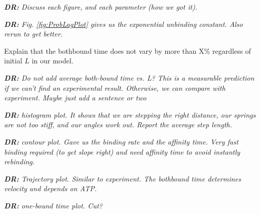 \documentclass[9pt,twocolumn,twoside]{article}
\newcommand\davidsays[1]{{\em\color{blue} {\bf DR:} #1}}
\begin{document}
\newpage

\davidsays{Discuss each figure, and each parameter (how we got it).}

\davidsays{Fig. \ref{fig:ProbLagPlot} gives us the exponential unbinding constant. Also rerun to get better.

Explain that the bothbound time does not vary by more than X\% regardless of initial $L$ in our model.}

\davidsays{Do not add average both-bound time vs. L? This is a measurable prediction if we can't find an experimental result.  Otherwise, we can compare with experiment.  Maybe just add a sentence or two}

\davidsays{histogram plot.  It shows that we are stepping the right distance, our springs are not too stiff, and our angles work out.  Report the average step length.}

\davidsays{contour plot. Gave us the binding rate and the affinity time.  
Very fast binding required (to get slope right) and need affinity time to avoid instantly rebinding.}

\davidsays{Trajectory plot.  Similar to experiment. The bothbound time determines velocity and depends on ATP.}


\davidsays{one-bound time plot. Cut?}



\end{document}
